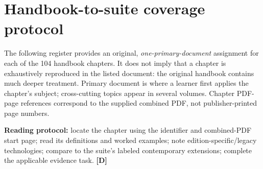 \documentclass[10pt,letterpaper,oneside]{article}
\newcommand{\designed}{\textsf{\color{accent}\textbf{[D]}}}
\begin{document}
\section{Handbook-to-suite coverage protocol}
The following register provides an original, \emph{one-primary-document} assignment for each of the 104 handbook chapters. It does not imply that a chapter is exhaustively reproduced in the listed document: the original handbook contains much deeper treatment. Primary document is where a learner first applies the chapter's subject; cross-cutting topics appear in several volumes. Chapter PDF-page references correspond to the supplied combined PDF, not publisher-printed page numbers.
\begin{sourcebox}\textbf{Reading protocol:} locate the chapter using the identifier and combined-PDF start page; read its definitions and worked examples; note edition-specific/legacy technologies; compare to the suite's labeled contemporary extensions; complete the applicable evidence task. \designed{}\end{sourcebox}
\end{document}
